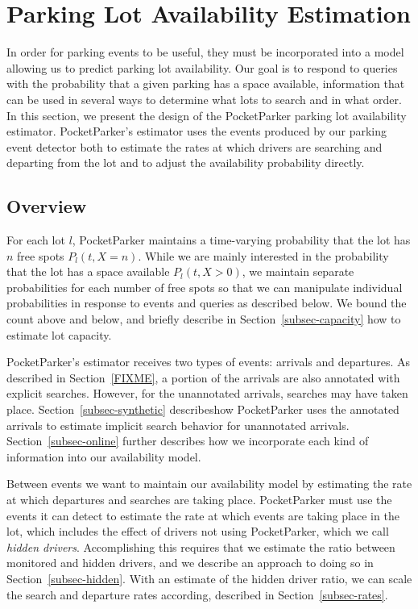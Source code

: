 \clearpage
\newpage

\section{Parking Lot Availability Estimation}
\label{sec-model}

In order for parking events to be useful, they must be incorporated into a
model allowing us to predict parking lot availability. Our goal is to respond
to queries with the probability that a given parking has a space available,
information that can be used in several ways to determine what lots to search
and in what order. In this section, we present the design of the PocketParker
parking lot availability estimator. PocketParker's estimator uses the events
produced by our parking event detector both to estimate the rates at which
drivers are searching and departing from the lot and to adjust the
availability probability directly.

\subsection{Overview}

For each lot $l$, PocketParker maintains a time-varying probability that the
lot has $n$ free spots $P_l(t, X = n)$. While we are mainly interested in the
probability that the lot has a space available $P_l(t, X > 0)$, we maintain
separate probabilities for each number of free spots so that we can
manipulate individual probabilities in response to events and queries as
described below. We bound the count above and below, and briefly describe in
Section~\ref{subsec-capacity} how to estimate lot capacity.

PocketParker's estimator receives two types of events: arrivals and
departures. As described in Section~\ref{FIXME}, a portion of the arrivals
are also annotated with explicit searches. However, for the unannotated
arrivals, searches may have taken place. Section~\ref{subsec-synthetic}
describeshow PocketParker uses the annotated arrivals to estimate implicit
search behavior for unannotated arrivals. Section~\ref{subsec-online} further
describes how we incorporate each kind of information into our availability
model.

Between events we want to maintain our availability model by estimating the
rate at which departures and searches are taking place. PocketParker must use
the events it can detect to estimate the rate at which events are taking
place in the lot, which includes the effect of drivers not using
PocketParker, which we call \textit{hidden drivers}. Accomplishing this
requires that we estimate the ratio between monitored and hidden drivers, and
we describe an approach to doing so in Section~\ref{subsec-hidden}. With an
estimate of the hidden driver ratio, we can scale the search and departure
rates according, described in Section~\ref{subsec-rates}.

